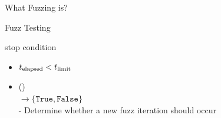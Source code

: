 \documentclass[10pt,aspectratio=43]{beamer}
\begin{document}
\begin{frame}[fragile] {What Fuzzing is?}
{\begin{block}{Fuzz Testing}
\begin{minipage}[t]{0.64\linewidth}
        \end{minipage} 
        \begin{minipage}[t]{0.35\linewidth}
            {
                \vspace{25pt}
                \centering
                stop condition
                \scriptsize{
                    \begin{itemize}  
                        \item  $t_\text{elapsed} < t_\text{limit}$
                        \item  \continue\normalfont(\confs)\\$\rightarrow \{\texttt{True}, \texttt{False}\}$
                        \\- Determine whether a new fuzz iteration should occur
                    \end{itemize} 
                }
            }
        \end{minipage}
        \end{block}
    }


\end{frame}
\end{document}
